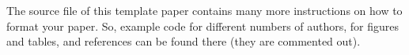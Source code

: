 \documentclass[conference,a4paper]{IEEEtran}
\begin{document}
The source file of this template paper contains many more instructions
on how to format your paper. So, example code for different numbers of
authors, for figures and tables, and references can be found there
(they are commented out).


\end{document}
